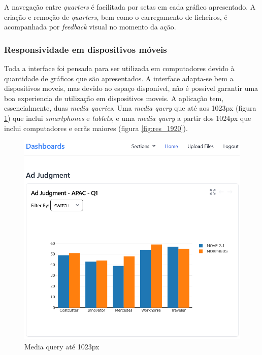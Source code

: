 A navegação entre \textit{quarters} é facilitada por setas em cada gráfico apresentado. A criação e remoção de \textit{quarters}, bem como o carregamento de ficheiros, é acompanhada por \textit{feedback} visual no momento da ação.

\subsubsection{Responsividade em dispositivos móveis}

Toda a interface foi pensada para ser utilizada em computadores devido à quantidade de gráficos que são apresentados. A interface adapta-se bem a dispositivos moveis, mas devido ao espaço disponível, não é possível garantir uma boa experiencia de utilização em dispositivos moveis. A aplicação tem, essencialmente, duas \textit{media queries}. Uma \textit{media query} que até aos 1023px (figura \ref{fig:res_1023}) que inclui \textit{smartphones} e \textit{tablets}, e uma \textit{media query} a partir dos 1024px que inclui computadores e ecrãs maiores (figura \ref{fig:res_1920}).

\begin{figure}[htbp]
    \centering
    \includegraphics[max width=\textwidth]{./img/res_1023}
 \caption{Media query até 1023px}
 \label{fig:res_1023}
\end{figure}


